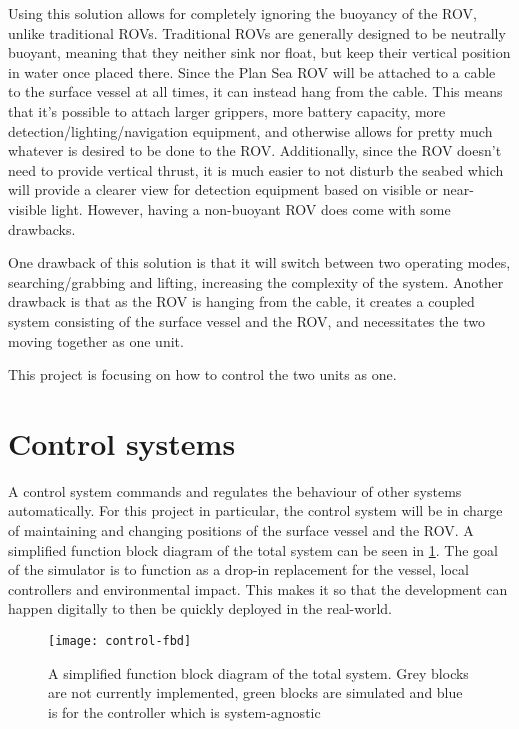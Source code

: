 Using this solution allows for completely ignoring the buoyancy of the ROV, unlike traditional ROVs. Traditional ROVs are generally designed to be neutrally buoyant, meaning that they neither sink nor float, but keep their vertical position in water once placed there. Since the Plan Sea ROV will be attached to a cable to the surface vessel at all times, it can instead hang from the cable. This means that it's possible to attach larger grippers, more battery capacity, more detection/lighting/navigation equipment, and otherwise allows for pretty much whatever is desired to be done to the ROV. Additionally, since the ROV doesn't need to provide vertical thrust, it is much easier to not disturb the seabed which will provide a clearer view for detection equipment based on visible or near-visible light. However, having a non-buoyant ROV does come with some drawbacks.

One drawback of this solution is that it will switch between two operating modes, searching/grabbing and lifting, increasing the complexity of the system. Another drawback is that as the ROV is hanging from the cable, it creates a coupled system consisting of the surface vessel and the ROV, and necessitates the two moving together as one unit. 

This project is focusing on how to control the two units as one. 

\section{Control systems}
A control system commands and regulates the behaviour of other systems automatically. For this project in particular, the control system will be in charge of maintaining and changing positions of the surface vessel and the ROV. A simplified function block diagram of the total system can be seen in \cref{fig:fbd}. The goal of the simulator is to function as a drop-in replacement for the vessel, local controllers and environmental impact. This makes it so that the development can happen digitally to then be quickly deployed in the real-world. 

\begin{figure}
	\centering
	\texttt{[image: control-fbd]}
	\caption{A simplified function block diagram of the total system. Grey blocks are not currently implemented, green blocks are simulated and blue is for the controller which is system-agnostic}
	\label{fig:fbd}
\end{figure}


